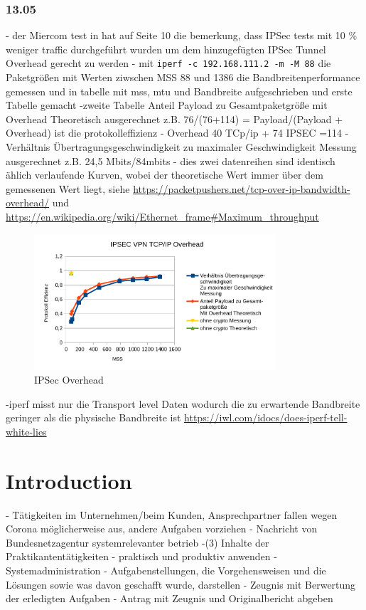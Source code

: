 \documentclass[english,runningheads,a4paper]{llncs}[2018/03/10]
\begin{document}
\subsubsection{13.05}
- der Miercom test in  hat auf Seite 10 die bemerkung, dass IPSec tests mit 10 \% weniger traffic durchgeführt wurden um dem hinzugefügten IPSec Tunnel Overhead gerecht zu werden
- mit \texttt{iperf -c 192.168.111.2 -m -M 88} die Paketgrößen mit Werten ziwschen MSS 88 und 1386 die Bandbreitenperformance gemessen
und in tabelle mit mss, mtu und Bandbreite aufgeschrieben und erste Tabelle gemacht
-zweite Tabelle Anteil Payload zu Gesamtpaketgröße mit Overhead Theoretisch ausgerechnet z.B. 76/(76+114) = Payload/(Payload + Overhead) ist die protokolleffizienz
- Overhead 40 TCp/ip + 74 IPSEC =114
-Verhältnis Übertragungsgeschwindigkeit zu maximaler Geschwindigkeit Messung ausgerechnet z.B. 24,5 Mbits/84mbits
- dies zwei datenreihen sind identisch ählich verlaufende Kurven, wobei der theoretische Wert immer über dem gemessenen Wert liegt, siehe 
\url{https://packetpushers.net/tcp-over-ip-bandwidth-overhead/} und \url{https://en.wikipedia.org/wiki/Ethernet_frame#Maximum_throughput}
\begin{figure}
	\centering
	\includegraphics[width=0.8\textwidth]{images/tcpipoverhead.pdf}
	\caption{IPSec Overhead}
	\label{fig:tcpipoverhead}
\end{figure}
-iperf misst nur die Transport level Daten wodurch die zu erwartende Bandbreite geringer als die physische Bandbreite ist \url{https://iwl.com/idocs/does-iperf-tell-white-lies}
\section{Introduction}\label{sec:intro}
- Tätigkeiten im Unternehmen/beim Kunden, Ansprechpartner fallen wegen Corona möglicherweise aus, andere Aufgaben vorziehen
- Nachricht von Bundesnetzagentur systemrelevanter betrieb
-(3) Inhalte der Praktikantentätigkeiten
- praktisch und produktiv anwenden
- Systemadministration
- Aufgabenstellungen,  die  Vorgehensweisen  und  die  Lösungen sowie was davon geschafft wurde, darstellen
- Zeugnis mit Berwertung der erledigten Aufgaben
- Antrag mit Zeugnis und Originalbericht abgeben
\end{document}
